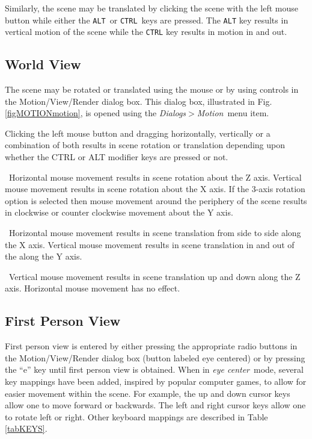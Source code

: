 \documentclass[11pt,twoside]{book}
\newcommand{\parma}{.75}
\newcommand{\parmb}{.5}
\newcommand{\parmc}{0.25}
\newcommand{\blist}{
\begin{list}
{}{
\setlength{\leftmargin}{\parma in}
\setlength{\labelwidth}{\parmb in}
\setlength{\labelsep}{\parmc in}
\setlength{\listparindent}{0.3in}
\setlength{\topsep}{.3in}
\setlength{\parsep}{.0in}
}}
\newcommand{\elist}{\end{list}}
\newcommand{\hitem}[1]{\item[{\bf #1} \hfill]}
\begin{document}
Similarly, the scene may be translated by clicking the scene with the left mouse button while either the {\tt ALT}\ or {\tt CTRL}\ keys are pressed.
The {\tt ALT} key results in vertical motion of the scene while the {\tt CTRL} key results in motion in and out.

\subsection{World View}

The scene may be rotated or translated using the mouse or
by using controls in the Motion/View/Render dialog box.
This dialog box, illustrated in Fig. \ref{figMOTIONmotion}, is opened
using the {\em Dialogs$>$Motion}\ menu item.

Clicking the left mouse button and dragging horizontally,
vertically or a combination of both results in scene rotation or
translation depending upon whether the CTRL or ALT modifier keys
are pressed or not.

\blist

\hitem{no modifier keys}\ Horizontal mouse movement results in
scene rotation about the Z axis. Vertical mouse movement results
in scene rotation about the X axis.  If the 3-axis rotation option
is selected then mouse movement around the periphery of the scene
results in clockwise or counter clockwise movement about the Y
axis.

\hitem{CTRL key depressed}\ Horizontal mouse movement results in
scene translation from side to side along the X axis. Vertical
mouse movement results in scene translation in and out of the
along the Y axis.

\hitem{ALT key depressed}\ Vertical mouse movement results in scene
translation up and down along the Z axis. Horizontal mouse
movement has no effect.

\elist

\subsection{First Person View}
\label{section:eyeview}
First person view is entered by either pressing the appropriate
radio buttons in the Motion/View/Render dialog box (button
labeled eye centered) or by pressing the ``e'' key until first
person view is obtained. When in {\em eye center}\ mode, several
key mappings have been added, inspired by popular computer games,
to allow for easier movement within the scene. For example, the up
and down cursor keys allow one to move forward or backwards.  The
left and right cursor keys allow one to rotate left or right.
Other keyboard mappings are described in Table \ref{tabKEYS}.
\end{document}
